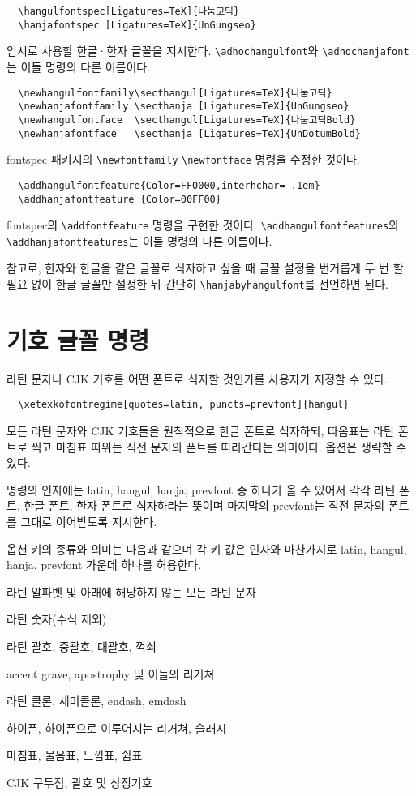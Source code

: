 \documentclass[a4paper]{article}
\def\cs#1{\texttt{\color{red!70!black}\textbackslash #1}}
\begin{document}
\begin{verbatim}
  \hangulfontspec[Ligatures=TeX]{나눔고딕}
  \hanjafontspec [Ligatures=TeX]{UnGungseo}
\end{verbatim}
임시로 사용할 한글·한자 글꼴을 지시한다.
\cs{adhochangulfont}와 \cs{adhochanjafont}는 이들 명령의 다른 이름이다.

\begin{verbatim}
  \newhangulfontfamily\secthangul[Ligatures=TeX]{나눔고딕}
  \newhanjafontfamily \secthanja [Ligatures=TeX]{UnGungseo}
  \newhangulfontface  \secthangul[Ligatures=TeX]{나눔고딕Bold}
  \newhanjafontface   \secthanja [Ligatures=TeX]{UnDotumBold}
\end{verbatim}
fontspec 패키지의 \verb+\newfontfamily+ \verb+\newfontface+ 명령을
수정한 것이다.

\begin{verbatim}
  \addhangulfontfeature{Color=FF0000,interhchar=-.1em}
  \addhanjafontfeature {Color=00FF00}
\end{verbatim}
fontspec의 \verb+\addfontfeature+ 명령을 구현한 것이다.
\cs{addhangulfontfeatures}와\\ \cs{addhanjafontfeatures}는
이들 명령의 다른 이름이다.

\smallskip
참고로, 한자와 한글을 같은 글꼴로 식자하고 싶을 때 글꼴 설정을
번거롭게 두 번 할 필요 없이 한글 글꼴만 설정한 뒤 간단히
  \cs{hanjabyhangulfont}를 선언하면 된다.

\section{기호 글꼴 명령}
라틴 문자나 CJK 기호를 어떤 폰트로 식자할 것인가를 사용자가 지정할 수 있다.
\begin{verbatim}
  \xetexkofontregime[quotes=latin, puncts=prevfont]{hangul}
\end{verbatim}
모든 라틴 문자와 CJK 기호들을 원칙적으로 한글 폰트로 식자하되,
따옴표는 라틴 폰트로 찍고 마침표 따위는 직전 문자의 폰트를 따라간다는 의미이다.
옵션은 생략할 수 있다.

명령의 인자에는 latin, hangul, hanja, prevfont 중 하나가 올 수 있어서
각각 라틴 폰트, 한글 폰트, 한자 폰트로 식자하라는 뜻이며
마지막의 prevfont는 직전 문자의 폰트를 그대로 이어받도록 지시한다.

옵션 키의 종류와 의미는 다음과 같으며 각 키 값은 인자와 마찬가지로
latin, hangul, hanja, prevfont 가운데 하나를 허용한다.
\begin{description}\itemsep0pt
\item[alphs] 라틴 알파벳 및 아래에 해당하지 않는 모든 라틴 문자
\item[nums] 라틴 숫자(수식 제외)
\item[parens] 라틴 괄호, 중괄호, 대괄호, 꺽쇠
\item[quotes] accent grave, apostrophy 및 이들의 리거쳐
\item[colons] 라틴 콜론, 세미콜론, endash, emdash
\item[hyphens] 하이픈, 하이픈으로 이루어지는 리거쳐, 슬래시
\item[puncts] 마침표, 물음표, 느낌표, 쉼표
\item[cjksymbols] CJK 구두점, 괄호 및 상징기호
\end{description}
\end{document}
